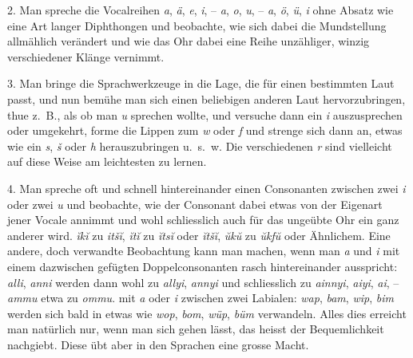 \label{sp.37}

2. Man spreche die Vocalreihen \textit{a}, \textit{ä}, \textit{e}, \textit{i}, – \textit{a},  \textit{o}, \textit{u}, – \textit{a}, \textit{ö}, \textit{ü}, \textit{i} ohne Absatz wie eine Art langer Diphthongen und beobachte, wie \label{fp.37} sich dabei die Mundstellung allmählich verändert und wie das Ohr dabei eine Reihe unzähliger, winzig verschiedener Klänge vernimmt. 

3. Man bringe die Sprachwerkzeuge in die Lage, die für einen bestimmten Laut passt, und nun bemühe man sich einen beliebigen anderen Laut hervorzubringen, thue z.~B., als ob man \textit{u} sprechen wollte, und versuche dann ein \textit{i} auszusprechen oder umgekehrt, forme die Lippen zum \textit{w} oder \textit{f} und strenge sich dann an, etwas wie ein \textit{s}, \textit{š} oder \textit{h} herauszubringen u.~s.~w. Die verschiedenen \textit{r} sind vielleicht auf diese Weise am leichtesten zu lernen. 

4. Man spreche oft und schnell hintereinander einen Consonanten zwischen zwei \textit{i} oder zwei \textit{u} und beobachte, wie der Consonant dabei etwas von der Eigenart jener Vocale annimmt und wohl schliesslich auch für das ungeübte Ohr ein ganz anderer wird. \textit{ĭkĭ} zu \textit{itšĭ}, \textit{ĭtĭ} zu \textit{ĭtsĭ} oder \textit{ĭtšĭ}, \textit{ŭkŭ} zu \textit{ŭkfŭ} oder Ähnlichem. Eine andere, doch verwandte Beobachtung kann man machen, wenn man \textit{a} und \textit{i} mit einem dazwischen gefügten Doppelconsonanten rasch hintereinander ausspricht: \textit{alli}, \textit{anni} werden dann wohl zu \textit{allyi}, \textit{annyi} und schliesslich zu  \textit{ainnyi}, \textit{aiyi}, \textit{ai}, – \textit{ammu} etwa zu \textit{ommu}.  mit \textit{a} oder \textit{i} zwischen zwei Labialen: \textit{wap}, \textit{bam}, \textit{wip}, \textit{bim} werden sich bald in etwas wie \textit{wop}, \textit{bom}, \textit{wüp}, \textit{büm} verwandeln. Alles dies erreicht man natürlich nur, wenn man sich gehen lässt, das heisst der Bequemlichkeit nachgiebt. Diese übt aber in den Sprachen eine grosse Macht.


